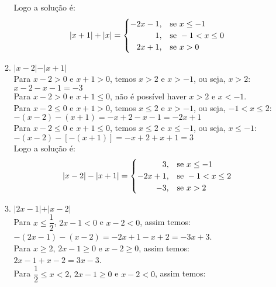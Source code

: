 \begin{enumerate}
\begin{enumerate}
			Logo a solução é:\\
			\begin{equation*}
		    	\vert x + 1 \vert + \vert x \vert =
			    \begin{cases}
			      -2x - 1, & \text{se}\ x \leq -1 \\
			      \hfill 1, & \text{se}\ -1 < x \leq 0 \\
			      \hfill 2x + 1, & \text{se}\ x > 0 
		    	\end{cases}
			\end{equation*}
			\item %
			$\vert x - 2\vert - \vert x + 1 \vert$\\
			Para $x - 2 > 0$ e $x + 1 > 0$, temos $x > 2$ e $x > -1$, ou seja, $x > 2$:\\
			$x - 2 - x - 1 = -3$\\
			Para $x - 2 > 0$ e $x + 1 \leq 0$, não é possível haver $x > 2$ e $ x < -1$.\\
			Para $x - 2 \leq 0$ e $x + 1 > 0$, temos $x \leq 2$ e $x > -1$, ou seja, $-1 < x \leq 2$:\\
			$-(x - 2) - (x + 1) = -x + 2 - x - 1 = -2x + 1$\\
			Para $x - 2 \leq 0$ e $x + 1 \leq 0$, temos $x \leq 2$ e $x \leq -1$, ou seja, $x \leq -1$:\\
			$-(x - 2) - [-(x + 1)] = -x + 2 + x + 1 = 3$\\
			Logo a solução é:\\
			\begin{equation*}
		    	\vert x - 2 \vert - \vert x + 1 \vert =
			    \begin{cases}
			      \hfill 3, & \text{se}\ x \leq -1 \\
			      -2x + 1, & \text{se}\ -1 < x \leq 2 \\
			      \hfill -3, & \text{se}\ x > 2 
		    	\end{cases}
			\end{equation*}
			\item %
			$\vert 2x -1 \vert + \vert x -2\vert$\\
			Para $x\leq\dfrac{1}{2}$, $2x - 1 < 0$ e $x - 2 <0$, assim temos:\\
			$-(2x-1)-(x-2) = -2x+1-x+2=-3x+3$.\\
			Para $x \geq 2$, $2x - 1 \geq 0$ e $x - 2 \geq 0$, assim temos:\\
			$2x-1+x-2=3x-3$.\\
			Para $\dfrac{1}{2} \leq x < 2$, $2x - 1 \geq 0$ e $x - 2 <0$, assim temos:\\

\end{enumerate}
\end{enumerate}
